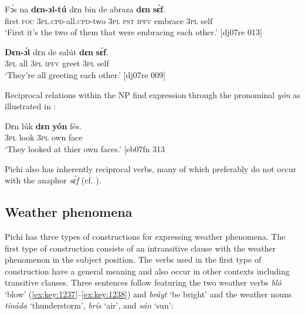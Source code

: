 \ea%
    \label{ex:key:1234}
    \gll Fɔ́s  na  \textbf{dɛn-ɔl-tú}      dɛn  bin  de  abraza  \textbf{dɛn}  \textbf{sɛ́f}.\\
first  \textsc{foc}  \textsc{3pl.cpd}{}-all.\textsc{cpd}{}-two  \textsc{3pl}  \textsc{pst}  \textsc{ipfv}  embrace  \textsc{3pl}  self\\

\glt ‘First it’s the two of them that were embracing each other.’ [dj07re 013]
\z


\ea%
    \label{ex:key:1235}
    \gll \textbf{Dɛn-ɔ́l}  dɛn  de  salút  \textbf{dɛn}  \textbf{sɛ́f}.\\
{\textsc{3pl}  all}  \textsc{3pl}  \textsc{ipfv}  greet  \textsc{3pl}  self\\

\glt ‘They’re all greeting each other.’ [dj07re 009]
\z

Reciprocal relations within the \textsc{NP} find expression through the pronominal \textit{yón} as illustrated in :


\ea%
    \label{ex:key:1236}
    \gll Dɛn  lúk    \textbf{dɛn}  \textbf{yón}     fés.\\
\textsc{3pl} look \textsc{3pl}  own    face\\

\glt ‘They looked at thier own faces.’ [eb07fn 313\textstylePichiexamplenumberZchnZchn{]}
\z

Pichi also has inherently reciprocal verbs, many of which preferably do not occur with the anaphor \textit{sɛ́f} (cf. ).{\fff} 

\subsection{Weather phenomena}\label{sec:9.3.7}

Pichi has three types of constructions for expressing weather phenomena. The first type of construction consists of an intransitive clause with the weather phenomenon in the subject position. The verbs used in the first type of construction have a general meaning and also occur in other contexts including transitive clauses. Three sentences follow featuring the two weather verbs \textit{bló} ‘blow’ (\ref{ex:key:1237}–\ref{ex:key:1238}) and \textit{bráyt} ‘be bright’  and the weather nouns \textit{tináda} ‘thunderstorm’, \textit{brís} ‘air’, and \textit{sán} ‘sun’: 


